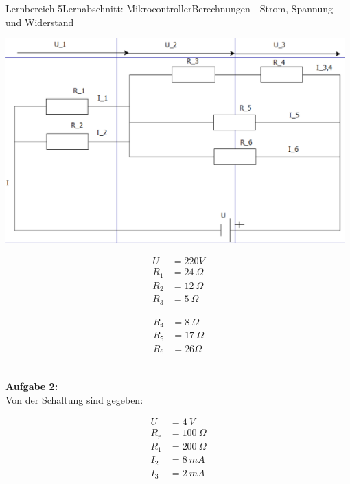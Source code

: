 \documentclass[oneside,openany,headings=optiontotoc,11pt,numbers=noenddot]{scrreprt}
\begin{document}
\begin{worksheet}{Lernbereich 5}{Lernabschnitt: Mikrocontroller}{Berechnungen - Strom, Spannung und Widerstand}
\begin{framed}
\begin{minipage}[c]{0.48\textwidth}
					\includegraphics[width=0.98\textwidth]{../99_Bilder/A1.png}
				\end{minipage}
				\hfill
				\begin{minipage}[c]{0.24\textwidth}
					\begin{align*}
						U & = 220V\\
						R_1 & = 24\ \Omega\\
						R_2 & = 12\ \Omega\\
						R_3 & = 5\ \Omega
					\end{align*}
				\end{minipage}
				\hfill
				\begin{minipage}[c]{0.24\textwidth}
					\begin{align*}
						R_4 & = 8\ \Omega\\
						R_5 & = 17\ \Omega\\
						R_6 & = 26 \Omega
					\end{align*}
				\end{minipage}\\
				\newpage
				\textbf{Aufgabe 2:}\\
				Von der Schaltung sind gegeben:\\
				\begin{minipage}{0.48\textwidth}
					\begin{align*}
						U & = 4\ V\\
						R_r & = 100\ \Omega\\
						R_1 & = 200\ \Omega\\
						I_2 & = 8\ mA\\
						I_3 & = 2\ mA
					\end{align*}
				\end{minipage}
				\hfill
				\begin{minipage}{0.5\textwidth}

\end{minipage}
\end{framed}
\end{worksheet}
\end{document}
